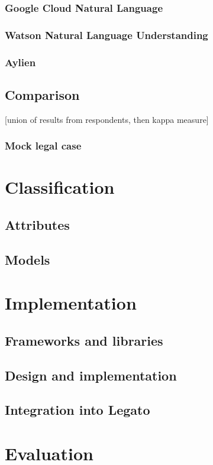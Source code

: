 \documentclass[
  digital, %
  table,   %
  lof,     %
  lot,     %
]{fithesis3}
\begin{document}
\subsection{Google Cloud Natural Language}
\subsection{Watson Natural Language Understanding}
\subsection{Aylien}

\section{Comparison}
[union of results from respondents, then kappa measure]
\subsection{Mock legal case}
\chapter{Classification}
\section{Attributes}
\section{Models}

\chapter{Implementation}
\section{Frameworks and libraries}
\section{Design and implementation}
\section{Integration into Legato}

\chapter{Evaluation}
\end{document}

